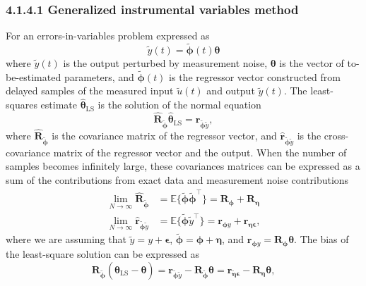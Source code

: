 \documentclass[11pt]{article}
\begin{document}
\begin{itemize}
\begin{itemize}
    \subsubsection*{4.1.4.1 Generalized instrumental variables method}
    For an errors-in-variables problem expressed as
    \begin{equation} \tag{4.26} \widetilde{y}(t) = \widetilde{\bm{\phi}}(t) \bm{\theta}   \end{equation}
    where $\widetilde{y}(t)$ is the output perturbed by measurement noise, $\bm{\theta}$ is the vector of to-be-estimated parameters, and $\widetilde{\bm{\phi}}(t)$ is the regressor vector constructed from delayed samples of the measured input $\widetilde{u}(t)$ and output $\widetilde{y}(t)$.
    The least-squares estimate $\widehat{\bm{\theta}}_{\mathrm{LS}}$ is the solution of the normal equation
    \begin{equation} \tag{4.27} \widehat{\mathbf{R}}_{\widetilde{\bm{\phi}}} \widehat{\bm{\theta}}_{\mathrm{LS}} = \widehat{\mathbf{r}}_{\widetilde{\bm{\phi}} \widetilde{y}} , \label{eqn:norm} \end{equation}
    where $\widehat{\mathbf{R}}_{\widetilde{\bm{\phi}}}$ is the covariance matrix of the regressor vector, and $\widehat{\mathbf{r}}_{\widetilde{\bm{\phi}} \widetilde{y}}$ is the cross-covariance matrix of the regressor vector and the output.
    When the number of samples becomes infinitely large, these covariances matrices can be expressed as a sum of the contributions from exact data and measurement noise contributions
    \begin{equation} \tag{4.28} \begin{aligned}  \lim\limits_{N \rightarrow \infty} \widehat{\mathbf{R}}_{\widetilde{\bm{\phi}}} &= \mathbb{E} \{ \widetilde{\bm{\phi}} \widetilde{\bm{\phi}}^\top \} = \mathbf{R}_{\bm{\phi}} + \mathbf{R}_{\bm{\eta}} \\ \lim\limits_{N \rightarrow \infty} \widehat{\mathbf{r}}_{\widetilde{\bm{\phi}} \widetilde{y}} &= \mathbb{E}\{ \widetilde{\bm{\phi}} \widetilde{y}^\top \} = {\mathbf{r}}_{\bm{\phi} y} + {\mathbf{r}}_{\bm{\eta} \bm{\epsilon}} , \end{aligned} \end{equation}
    where we are assuming that $\widetilde{y} =  y +\bm{\epsilon}$, $\widetilde{\bm{\phi}} = \bm{\phi} + \bm{\eta}$, and $\mathbf{r}_{\bm{\phi} y} = \mathbf{R}_{{\bm{\phi}}} \bm{\theta}$.
    The bias of the least-square solution can be expressed as 
    \begin{equation} \tag{4.29} \mathbf{R}_{\widetilde{\bm{\phi}}} \left( \widehat{\bm{\theta}}_{\mathrm{LS}} - \bm{\theta} \right) = \mathbf{r}_{\widetilde{\bm{\phi}} \widetilde{y}} - \mathbf{R}_{\widetilde{\bm{\phi}}} \bm{\theta} = \mathbf{r}_{\widetilde{\bm{\eta}} \bm{\epsilon}} - \mathbf{R}_{\bm{\eta}} \bm{\theta} , \end{equation}


\end{itemize}
\end{itemize}
\end{document}
